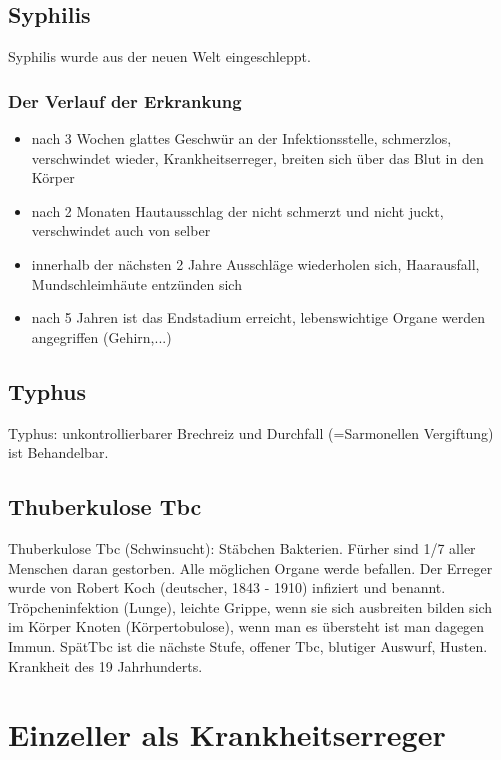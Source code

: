 \documentclass[a4paper]{article}
\begin{document}
\subsection{Syphilis}
Syphilis wurde aus der neuen Welt eingeschleppt. 

\subsubsection{Der Verlauf der Erkrankung}

\begin{itemize}
\item nach 3 Wochen glattes Geschwür an der Infektionsstelle, schmerzlos, verschwindet wieder, Krankheitserreger, breiten sich über das Blut in den Körper 
\item nach 2 Monaten Hautausschlag der nicht schmerzt und nicht juckt, verschwindet auch von selber
\item innerhalb der nächsten 2 Jahre Ausschläge wiederholen sich, Haarausfall, Mundschleimhäute entzünden sich
\item nach 5 Jahren ist das Endstadium erreicht, lebenswichtige Organe werden angegriffen (Gehirn,...)
\end{itemize}

\subsection{Typhus}

Typhus: unkontrollierbarer Brechreiz und Durchfall (=Sarmonellen Vergiftung) ist Behandelbar.

\subsection{Thuberkulose Tbc}
Thuberkulose Tbc (Schwinsucht): Stäbchen Bakterien. Fürher sind 1/7 aller Menschen daran gestorben. Alle möglichen Organe werde befallen. Der Erreger wurde von Robert Koch (deutscher, 1843 - 1910) infiziert und benannt. Tröpcheninfektion (Lunge), leichte Grippe, wenn sie sich ausbreiten bilden sich im Körper Knoten (Körpertobulose), wenn man es übersteht ist man dagegen Immun. SpätTbc ist die nächste Stufe, offener Tbc, blutiger Auswurf, Husten. 
Krankheit des 19 Jahrhunderts.


\section{Einzeller als Krankheitserreger}
\end{document}
